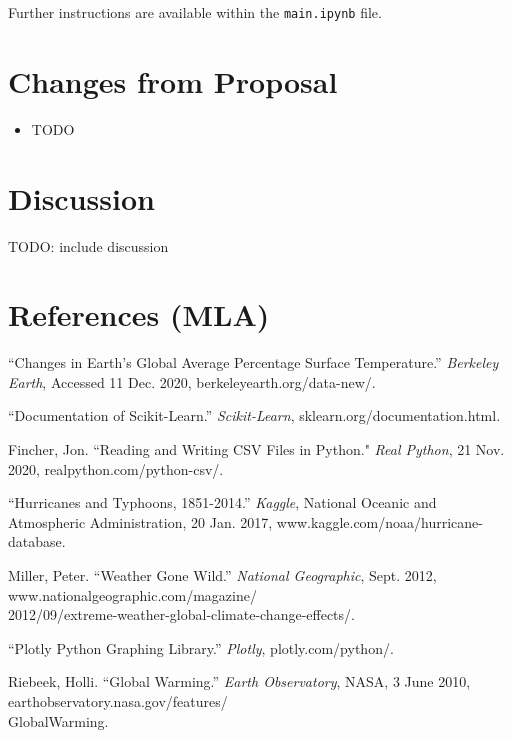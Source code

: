 \documentclass[fontsize=11pt]{article}
\begin{document}
Further instructions are available within the \texttt{main.ipynb} file.

\section*{Changes from Proposal}
\begin{itemize}
    \item TODO
\end{itemize}

\section*{Discussion}

TODO: include discussion

\section*{References (MLA)}

\begin{hangparas}{0.5in}{1}

“Changes in Earth's Global Average Percentage Surface Temperature.” \textit{Berkeley Earth}, Accessed 11 Dec. 2020, berkeleyearth.org/data-new/.

\bigskip

“Documentation of Scikit-Learn.” \textit{Scikit-Learn}, sklearn.org/documentation.html.

\bigskip

Fincher, Jon. ``Reading and Writing CSV Files in Python." \textit{Real Python}, 21 Nov. 2020, realpython.com/python-csv/.

\bigskip

“Hurricanes and Typhoons, 1851-2014.” \textit{Kaggle}, National Oceanic and Atmospheric Administration, 20 Jan. 2017, www.kaggle.com/noaa/hurricane-database.

\bigskip

Miller, Peter. “Weather Gone Wild.” \textit{National Geographic}, Sept. 2012, www.nationalgeographic.com/magazine/\\2012/09/extreme-weather-global-climate-change-effects/.

\bigskip

“Plotly Python Graphing Library.” \textit{Plotly}, plotly.com/python/.

\bigskip

Riebeek, Holli. “Global Warming.” \textit{Earth Observatory}, NASA, 3 June 2010, earthobservatory.nasa.gov/features/\\GlobalWarming.



\end{hangparas}
\end{document}
